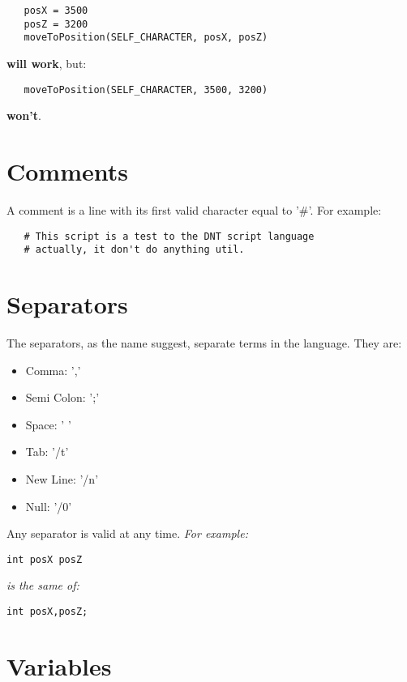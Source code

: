 \documentclass[ letterpaper,12pt]{article}
\begin{document}
\begin{verbatim}
   posX = 3500
   posZ = 3200
   moveToPosition(SELF_CHARACTER, posX, posZ)
\end{verbatim}

{\bf will work}, but:

\begin{verbatim}
   moveToPosition(SELF_CHARACTER, 3500, 3200)
\end{verbatim}

{\bf won't}.

\section{Comments}
 
   A comment is a line with its first valid character equal to '\#'. For
example:

\begin{verbatim}
   # This script is a test to the DNT script language
   # actually, it don't do anything util.
\end{verbatim}

\section{Separators}

   The separators, as the name suggest, separate terms in the language. They
are:

\begin{itemize}
\item{Comma: ','}
\item{Semi Colon: ';'}
\item{Space: ' '}
\item{Tab: '/t'}
\item{New Line: '/n'}
\item{Null: '/0'}
\end{itemize}

Any separator is valid at any time. {\it For example:}

\begin{verbatim}
int posX posZ
\end{verbatim}

{\it is the same of:}

\begin{verbatim}
int posX,posZ;
\end{verbatim}

\section{Variables}
\end{document}
